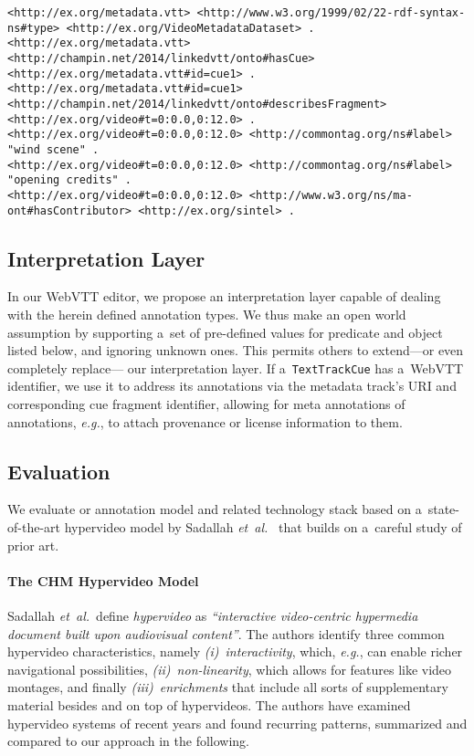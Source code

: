 \documentclass{sig-alternate-ceur}
\def\JSONLD{\mbox{JSON-LD}}
\begin{document}
\begin{lstlisting}[caption={RDF triples based on the \JSONLD\ code from \autoref{listing:jsonld}},
  label=listing:rdftriples, float=t!]
<http://ex.org/metadata.vtt> <http://www.w3.org/1999/02/22-rdf-syntax-ns#type> <http://ex.org/VideoMetadataDataset> .
<http://ex.org/metadata.vtt> <http://champin.net/2014/linkedvtt/onto#hasCue> <http://ex.org/metadata.vtt#id=cue1> .
<http://ex.org/metadata.vtt#id=cue1> <http://champin.net/2014/linkedvtt/onto#describesFragment> <http://ex.org/video#t=0:0.0,0:12.0> .
<http://ex.org/video#t=0:0.0,0:12.0> <http://commontag.org/ns#label> "wind scene" .
<http://ex.org/video#t=0:0.0,0:12.0> <http://commontag.org/ns#label> "opening credits" .
<http://ex.org/video#t=0:0.0,0:12.0> <http://www.w3.org/ns/ma-ont#hasContributor> <http://ex.org/sintel> .
\end{lstlisting}
  
\subsection{Interpretation Layer}

In our WebVTT editor,
we propose an interpretation layer
capable of dealing with the herein defined annotation types. 
We thus make an open world assumption
by supporting a~set of pre-defined values for predicate and object
listed below, and ignoring unknown ones.
This permits others to extend---or even completely replace---%
our interpretation layer.
If a~\texttt{TextTrackCue} has a~WebVTT identifier,
we use it to address its annotations
via the metadata track's URI
and corresponding cue fragment identifier,
allowing for meta annotations of annotations, \emph{e.g.},
to attach provenance or license information to them.

\subsection{Evaluation}

We evaluate or annotation model and related technology stack
based on a~state-of-the-art hypervideo model by
Sadallah \emph{et~al.}~\cite{sadallah2012hypervideo}
that builds on a~careful study of prior art.

\paragraph{The CHM Hypervideo Model}

Sadallah \emph{et~al.}\ define
\emph{hypervideo} as \textit{``interactive video-cen\-tric
hypermedia document built upon audiovisual content''}.
The authors identify three common hypervideo characteristics,
namely \emph{(i)}~\emph{interactivity}, which, \emph{e.g.},
can enable richer navigational possibilities,
\emph{(ii)}~\emph{non-linearity}, which allows for features
like video montages, and finally \emph{(iii)}~\emph{enrichments}
that include all sorts of supplementary material besides
and on top of hypervideos.
The authors have examined hypervideo systems
of recent years and found recurring patterns,
summarized and compared to our approach
in the following.\\
\end{document}
